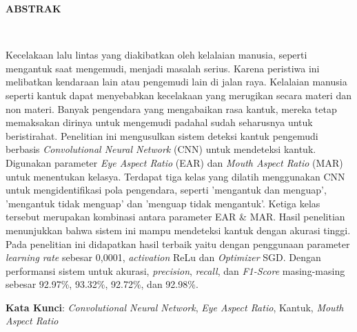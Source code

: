 \clearpage
\centering
{}
 \vspace{1em}
\normalsize \bfseries \centering \MakeUppercase{Abstrak}
% 
\\[2\baselineskip]

\justifying \normalfont \normalsize
{

Kecelakaan lalu lintas yang diakibatkan oleh kelalaian manusia, seperti mengantuk saat mengemudi, menjadi masalah serius. Karena peristiwa ini  melibatkan kendaraan lain atau pengemudi lain di jalan raya. Kelalaian manusia seperti kantuk dapat menyebabkan kecelakaan yang merugikan secara materi dan non materi. Banyak pengendara yang mengabaikan rasa kantuk, mereka tetap memaksakan dirinya untuk mengemudi padahal sudah seharusnya untuk beristirahat. Penelitian ini mengusulkan sistem deteksi kantuk pengemudi berbasis \textit{Convolutional Neural Network} (CNN) untuk mendeteksi kantuk. Digunakan parameter \textit{Eye Aspect Ratio} (EAR) dan \textit{Mouth Aspect Ratio} (MAR) untuk menentukan kelasya. Terdapat tiga kelas yang dilatih menggunakan CNN untuk mengidentifikasi pola pengendara, seperti 'mengantuk dan menguap', 'mengantuk tidak menguap' dan 'menguap tidak mengantuk'. Ketiga kelas tersebut 
merupakan kombinasi antara parameter EAR \& MAR. Hasil penelitian menunjukkan bahwa sistem ini mampu mendeteksi kantuk dengan akurasi tinggi. Pada penelitian ini didapatkan hasil terbaik yaitu dengan penggunaan parameter \textit{learning rate} sebesar 0,0001, \textit{activation} ReLu dan \textit{Optimizer} SGD. Dengan performansi sistem untuk akurasi, \textit{precision}, \textit{recall}, dan \textit{F1-Score} masing-masing sebesar 92.97\%, 93.32\%, 92.72\%, dan 92.98\%.

}

\textbf{Kata Kunci}: \textit{Convolutional Neural Network}, \textit{Eye Aspect Ratio}, Kantuk, \textit{Mouth Aspect Ratio}
\clearpage